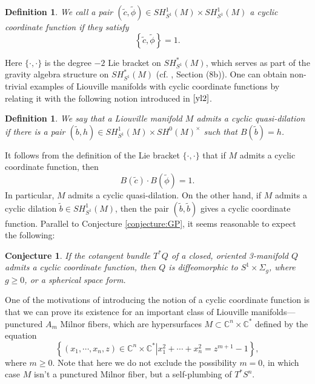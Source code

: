 \documentclass[a4paper]{article}
\newtheorem{definition}[theorem]{Definition}
\newtheorem{conjecture}[theorem]{Conjecture}
\numberwithin{equation}{section}
\begin{document}
\begin{definition}
We call a pair $(\tilde{c},\tilde{\phi})\in\mathit{SH}_{S^1}^1(M)\times\mathit{SH}_{S^1}^1(M)$ a cyclic coordinate function if they satisfy
\begin{equation}
\left\{\tilde{c},\tilde{\phi}\right\}=1.
\end{equation}
\end{definition}

Here $\{\cdot,\cdot\}$ is the degree $-2$ Lie bracket on $\mathit{SH}_{S^1}^\ast(M)$, which serves as part of the gravity algebra structure on $\mathit{SH}_{S^1}^\ast(M)$ (cf. \cite{ps2}, Section (8b)). One can obtain non-trivial examples of Liouville manifolds with cyclic coordinate functions by relating it with the following notion introduced in $\cite{yl2}$.

\begin{definition}\label{definition:cyclic-quasi}
We say that a Liouville manifold $M$ admits a cyclic quasi-dilation if there is a pair $(\tilde{b},h)\in\mathit{SH}_{S^1}^1(M)\times\mathit{SH}^0(M)^\times$ such that $B(\tilde{b})=h$.
\end{definition}

It follows from the definition of the Lie bracket $\{\cdot,\cdot\}$ that if $M$ admits a cyclic coordinate function, then
\begin{equation}\label{eq:B}
B(\tilde{c})\cdot B(\tilde{\phi})=1.
\end{equation}
In particular, $M$ admits a cyclic quasi-dilation. On the other hand, if $M$ admits a cyclic dilation $\tilde{b}\in\mathit{SH}_{S^1}^1(M)$, then the pair $(\tilde{b},\tilde{b})$ gives a cyclic coordinate function. Parallel to Conjecture \ref{conjecture:GP}, it seems reasonable to expect the following:

\begin{conjecture}
If the cotangent bundle $T^\ast Q$ of a closed, oriented 3-manifold $Q$ admits a cyclic coordinate function, then $Q$ is diffeomorphic to $S^1\times\Sigma_g$, where $g\geq0$, or a spherical space form.
\end{conjecture}

One of the motivations of introducing the notion of a cyclic coordinate function is that we can prove its existence for an important class of Liouville manifolds---punctured $A_m$ Milnor fibers, which are hypersurfaces $M\subset\mathbb{C}^n\times\mathbb{C}^\ast$ defined by the equation
\begin{equation}
\left\{(x_1,\cdots,x_n,z)\in\mathbb{C}^n\times\mathbb{C}^\ast\left|x_1^2+\cdots+x_n^2=z^{m+1}-1\right.\right\},
\end{equation}
where $m\geq0$. Note that here we do not exclude the possibility $m=0$, in which case $M$ isn't a punctured Milnor fiber, but a self-plumbing of $T^\ast S^n$.
\end{document}
